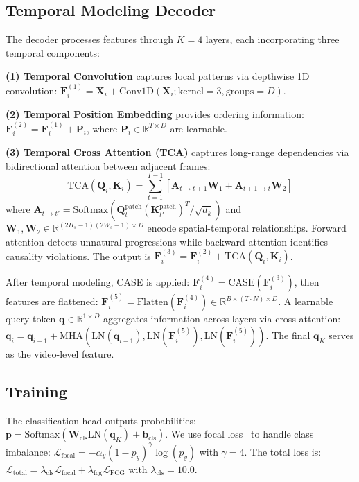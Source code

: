 \subsection{Temporal Modeling Decoder}

The decoder processes features through $K=4$ layers, each incorporating three temporal components:

\textbf{(1) Temporal Convolution} captures local patterns via depthwise 1D convolution: $\mathbf{F}_i^{(1)} = \mathbf{X}_i + \text{Conv1D}(\mathbf{X}_i; \text{kernel}=3, \text{groups}=D)$.

\textbf{(2) Temporal Position Embedding} provides ordering information: $\mathbf{F}_i^{(2)} = \mathbf{F}_i^{(1)} + \mathbf{P}_i$, where $\mathbf{P}_i \in \mathbb{R}^{T \times D}$ are learnable.

\textbf{(3) Temporal Cross Attention (TCA)} captures long-range dependencies via bidirectional attention between adjacent frames:
\begin{equation}
\text{TCA}(\mathbf{Q}_i, \mathbf{K}_i) = \sum_{t=1}^{T-1} [\mathbf{A}_{t \rightarrow t+1} \mathbf{W}_1 + \mathbf{A}_{t+1 \rightarrow t} \mathbf{W}_2]
\end{equation}
where $\mathbf{A}_{t \rightarrow t'} = \text{Softmax}(\mathbf{Q}_t^{\text{patch}} (\mathbf{K}_{t'}^{\text{patch}})^T / \sqrt{d_k})$ and $\mathbf{W}_1, \mathbf{W}_2 \in \mathbb{R}^{(2H_s-1)(2W_s-1) \times D}$ encode spatial-temporal relationships. Forward attention detects unnatural progressions while backward attention identifies causality violations. The output is $\mathbf{F}_i^{(3)} = \mathbf{F}_i^{(2)} + \text{TCA}(\mathbf{Q}_i, \mathbf{K}_i)$.

After temporal modeling, CASE is applied: $\mathbf{F}_i^{(4)} = \text{CASE}(\mathbf{F}_i^{(3)})$, then features are flattened: $\mathbf{F}_i^{(5)} = \text{Flatten}(\mathbf{F}_i^{(4)}) \in \mathbb{R}^{B \times (T \cdot N) \times D}$. A learnable query token $\mathbf{q} \in \mathbb{R}^{1 \times D}$ aggregates information across layers via cross-attention: $\mathbf{q}_i = \mathbf{q}_{i-1} + \text{MHA}(\text{LN}(\mathbf{q}_{i-1}), \text{LN}(\mathbf{F}_i^{(5)}), \text{LN}(\mathbf{F}_i^{(5)}))$. The final $\mathbf{q}_K$ serves as the video-level feature.

\subsection{Training}

The classification head outputs probabilities: $\mathbf{p} = \text{Softmax}(\mathbf{W}_{\text{cls}} \text{LN}(\mathbf{q}_K) + \mathbf{b}_{\text{cls}})$. We use focal loss~\cite{lin2017focal} to handle class imbalance: $\mathcal{L}_{\text{focal}} = -\alpha_y (1 - p_y)^\gamma \log(p_y)$ with $\gamma=4$. The total loss is: $\mathcal{L}_{\text{total}} = \lambda_{\text{cls}} \mathcal{L}_{\text{focal}} + \lambda_{\text{fcg}} \mathcal{L}_{\text{FCG}}$ with $\lambda_{\text{cls}}=10.0$.

